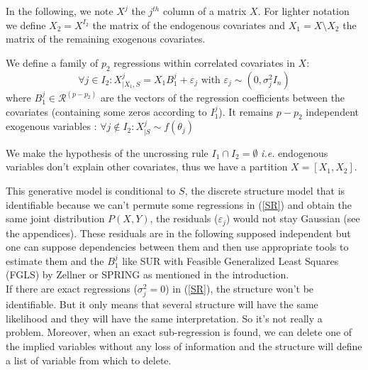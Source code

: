 \documentclass[11pt,a4paper]{article}
\begin{document}
In the following, we note $X^j$ the $j^{th}$ column of a matrix $X$.
For lighter notation we define $X_2=X^{I_2}$ the matrix of the endogenous covariates and $X_1=X\setminus X_2$ the matrix of the remaining exogenous covariates. 

We define a family of $p_2$ regressions within correlated covariates in $X$:
	\begin{equation}
		\forall j \in I_2: X^j_{|X_1,S}=X_1B^j_1+\varepsilon_j \textrm{ with } \varepsilon_j \sim(0,\sigma^2_jI_n) \label{SR}
	\end{equation}
		where $B_1^j \in \mathcal{R}^{(p-p_2)}$ are the vectors of the regression coefficients between the covariates (containing some zeros according to $I_1^j$).
It remains $p-p_2$ independent exogenous variables : $\forall j \notin I_2 : X^j_{|S} \sim f(\theta_j)$

We make the hypothesis of the uncrossing rule $I_1\cap I_2=\emptyset$ {\it i.e.} endogenous variables don't explain other covariates, thus we have a partition $X=[X_1,X_2]$.

This generative model is conditional to $S$, the discrete structure model that is identifiable because we can't permute some regressions in (\ref{SR}) and obtain the same joint distribution $P(X,Y)$, the residuals ($\varepsilon_j$) would not stay Gaussian (see the appendices). These residuals are in the following supposed independent but one can suppose dependencies between them and then use appropriate tools to estimate them and the $B_1^j$ like SUR with Feasible Generalized Least Squares (FGLS) by Zellner \cite{SURzellner} or SPRING \cite{chiquetconf} as mentioned in the introduction.
\\
If there are exact regressions ($\sigma^2_j=0$) in (\ref{SR}), the structure won't be identifiable. But it only means that several structure will have the same likelihood and they will have the same interpretation. So it's not really a problem. Moreover, when an exact sub-regression is found, we can delete one of the implied variables without any loss of information and the structure will define a list of variable from which to delete. %
	
\end{document}
